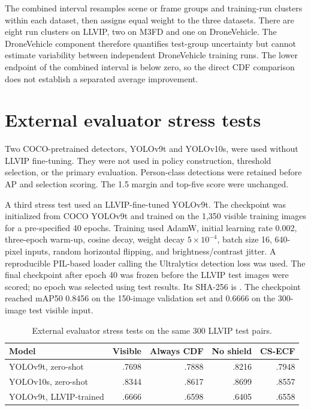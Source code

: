 \documentclass[11pt]{article}
\begin{document}
The combined interval resamples scene or frame groups and training-run clusters
within each dataset, then assigns equal weight to the three datasets. There are
eight run clusters on LLVIP, two on M3FD and one on DroneVehicle. The
DroneVehicle component therefore quantifies test-group uncertainty but cannot
estimate variability between independent DroneVehicle training runs. The lower
endpoint of the combined interval is below zero, so the direct CDF comparison
does not establish a separated average improvement.

\section{External evaluator stress tests}

Two COCO-pretrained detectors, YOLOv9t and YOLOv10s, were used without LLVIP
fine-tuning. They were not used in policy construction, threshold selection, or
the primary evaluation. Person-class detections were retained before AP and
selection scoring. The 1.5 margin and top-five score were unchanged.

A third stress test used an LLVIP-fine-tuned YOLOv9t. The checkpoint was
initialized from COCO YOLOv9t and trained on the 1,350 visible training images
for a pre-specified 40 epochs. Training used AdamW, initial learning rate
0.002, three-epoch warm-up, cosine decay, weight decay \(5\times10^{-4}\), batch
size 16, 640-pixel inputs, random horizontal flipping, and
brightness/contrast jitter. A reproducible PIL-based loader calling the
Ultralytics detection loss was used. The final checkpoint after epoch 40 was
frozen before the LLVIP test images were scored; no epoch was selected using
test results. Its SHA-256 is
\texttt{}.
The checkpoint reached mAP50 0.8456 on the 150-image validation set and 0.6666
on the 300-image test visible input.

\begin{table}[ht]
\centering
\small
\caption{External evaluator stress tests on the same 300 LLVIP test pairs.}
\begin{tabular}{@{}lrrrr@{}}
\toprule
Model & Visible & Always CDF & No shield & CS-ECF \\
\midrule
YOLOv9t, zero-shot & .7698 & .7888 & .8216 & .7948 \\
YOLOv10s, zero-shot & .8344 & .8617 & .8699 & .8557 \\
YOLOv9t, LLVIP-trained & .6666 & .6598 & .6405 & .6558 \\
\bottomrule
\end{tabular}
\end{table}
\end{document}
